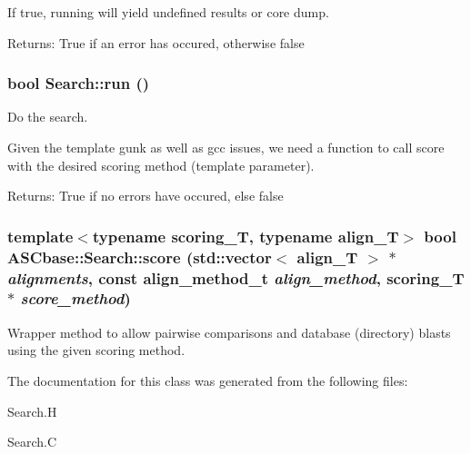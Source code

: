 If true, running will yield undefined results or core dump. 

\begin{Desc}
\item[Returns:]True if an error has occured, otherwise false \end{Desc}
\subsubsection{\setlength{\rightskip}{0pt plus 5cm}bool Search::run ()}\label{classASCbase_1_1Search_051f1638b64fb50b60b1b6dd5f10305e}


Do the search. 

Given the template gunk as well as gcc issues, we need a function to call score with the desired scoring method (template parameter).

\begin{Desc}
\item[Returns:]True if no errors have occured, else false \end{Desc}
\subsubsection{\setlength{\rightskip}{0pt plus 5cm}template$<$typename scoring\_\-T, typename align\_\-T$>$ bool ASCbase::Search::score (std::vector$<$ align\_\-T $>$ $\ast$ {\em alignments}, const align\_\-method\_\-t {\em align\_\-method}, scoring\_\-T $\ast$ {\em score\_\-method})\hspace{0.3cm}{\tt  [inline, protected]}}\label{classASCbase_1_1Search_1da1018845426f8b1ebfcf3388d6dbed}


Wrapper method to allow pairwise comparisons and database (directory) blasts using the given scoring method. 

The documentation for this class was generated from the following files:\begin{CompactItemize}
\item 
Search.H\item 
Search.C\end{CompactItemize}
